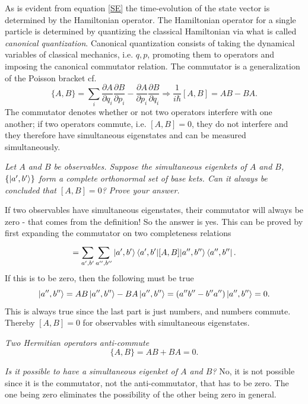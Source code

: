 As is evident from equation \eqref{SE} the time-evolution of the state vector is determined by the Hamiltonian operator. The Hamiltonian operator for a single particle is determined by quantizing the classical Hamiltonian via what is called \emph{canonical quantization}. Canonical quantization consists of taking the dynamical variables of classical mechanics, i.e. $q,p$, promoting them to operators and imposing the canonical commutator relation. The commutator is a generalization of the Poisson bracket cf.
\begin{equation}
	\{A,B\}=\sum_i\frac{\partial A}{\partial q_i}\frac{\partial B}{\partial p_i}-\frac{\partial A}{\partial p_i}\frac{\partial B}{\partial q_i}\Rightarrow \frac{1}{i\hbar}[A,B]=AB-BA.
\end{equation} 
The commutator denotes whether or not two operators interfere with one another; if two operators commute, i.e. $[A,B]=0$, they do not interfere and they therefore have simultaneous eigenstates and can be measured simultaneously.

\begin{example}
	\emph{Let $A$ and $B$ be observables. Suppose the simultaneous eigenkets of $A$ and $B$, $\{\ket{a',b'}\}$ form a complete orthonormal set of base kets. Can it always be concluded that $[A,B]=0$? Prove your answer.}\newline
	
	If two observables have simultaneous eigenstates, their commutator will always be zero - that comes from the definition! So the answer is yes. This can be proved by first expanding the commutator on two completeness relations
	\begin{equation}
		[A,B]=\sum_{a',b'}^{}\sum_{a'',b''}^{}\ket{a',b'}\braket{a',b'|[A,B]|a'',b''}\bra{a'',b''}.
	\end{equation} 
	If this is to be zero, then the following must be true
	\begin{equation}
		[A,B]\ket{a'',b''}=AB\ket{a'',b''}-BA\ket{a'',b''}=(a''b''-b''a'')\ket{a'',b''}=0.
	\end{equation} 
	This is always true since the last part is just numbers, and numbers commute. Thereby $[A,B]=0$ for observables with simultaneous eigenstates.
\end{example}

\begin{example}
	\emph{Two Hermitian operators anti-commute}
	\begin{equation}
		\{A,B\}=AB+BA=0.
	\end{equation} 
	
	\emph{Is it possible to have a simultaneous eigenket of $A$ and $B$?}\newline
	No, it is not possible since it is the commutator, not the anti-commutator, that has to be zero. The one being zero eliminates the possibility of the other being zero in general.
\end{example}

